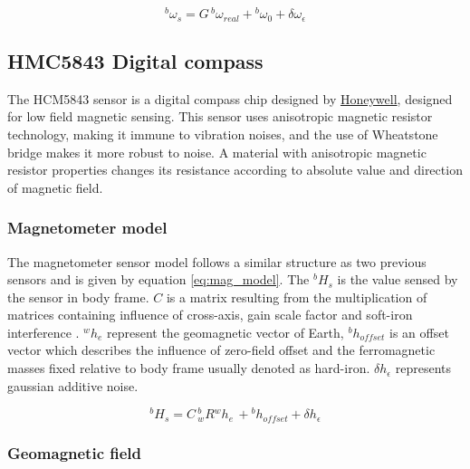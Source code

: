 \begin{equation}
{}^b\omega_{s}=G\,{}^b\omega_{real} + {}^b\omega_{0} + \delta\omega_{\epsilon}
\label{eq:gyro_model}
\end{equation}

\subsection{HMC5843 Digital compass} \label{subsection:hmc5843} 

The HCM5843 sensor is a digital compass chip designed by
\href{https://www.honeywell.com}{Honeywell}, designed for low field magnetic
sensing. This sensor uses anisotropic magnetic resistor technology, making it
immune to vibration noises, and the use of Wheatstone bridge makes it more
robust to noise. A material with anisotropic magnetic resistor properties
changes its resistance according to absolute value and direction of magnetic
field. 

\subsubsection{Magnetometer model}

The magnetometer sensor model follows a similar structure as two previous
sensors and is given by equation \eqref{eq:mag_model}. The ${}^bH_{s}$ is
the value sensed by the sensor in body frame. $C$ is a matrix resulting from
the multiplication of matrices containing influence of cross-axis, gain scale
factor and soft-iron interference \cite{magAN4246}. ${}^wh_e$ represent
the geomagnetic vector of Earth, ${}^bh_{offset}$ is an offset vector which
describes the influence of zero-field offset and the ferromagnetic masses fixed
relative to body frame usually denoted as hard-iron. $\delta h_{\epsilon}$ 
represents gaussian additive noise.

\begin{equation}
{}^bH_{s}=C\,{}^b_wR{}^wh_e\, + {}^bh_{offset} + \delta h_{\epsilon}
\label{eq:mag_model}
\end{equation}


\subsubsection{Geomagnetic field}\label{subsubsection: geomagnetic_field}

